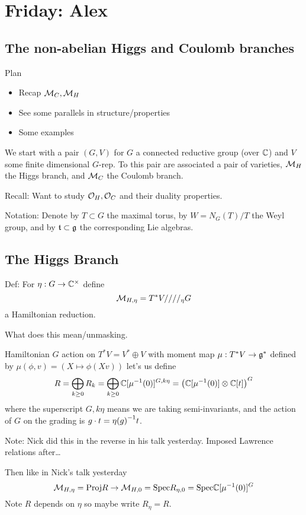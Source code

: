 \section{Friday: Alex}

\subsection{The non-abelian Higgs and Coulomb branches}

Plan 
\begin{itemize}
    \item Recap $\mathcal{M}_C,\mathcal{M}_H$
    \item See some parallels in structure/properties 
    \item Some examples
\end{itemize}

We start with a pair $(G,V)$ for $G$ a connected reductive group (over $\mathbb{C}$) and $V$ some finite dimensional $G$-rep. To this pair are associated a pair of varieties, $\mathcal{M}_H$ the Higgs branch, and $\mathcal{M}_C$ the Coulomb branch. 

Recall: Want to study ${\mathcal{O}}_H, {\mathcal{O}}_C$ and their duality properties. 

Notation: Denote by $T\subset G$ the maximal torus, by $W = N_G(T)/T$ the Weyl group, and by ${\mathfrak{t}}\subset \mathfrak{g}$ the corresponding Lie algebras.

\subsection{The Higgs Branch}

Def: For $\eta : G\rightarrow \mathbb{C}^\times$ define 
\[
    \mathcal{M}_{H,\eta} = T^\ast V ////_\eta G    
\]
a Hamiltonian reduction.

What does this mean/unmasking. 

Hamiltonian $G$ action on $T^\ast V = V^\ast \oplus V$ with moment map $\mu : T^\ast V \rightarrow \mathfrak{g}^\ast$ defined by $\mu(\phi,v) = (X\mapsto \phi(Xv))$ let's us define 
\[
    R = \bigoplus_{k\ge 0} R_k = \bigoplus_{k\ge 0} \mathbb{C}[{\mu}^{-1}(0)]^{G,k\eta} = \left(\mathbb{C}[{\mu}^{-1}(0)]\otimes \mathbb{C}[t] \right)^G
\]
where the superscript $G,k\eta$ means we are taking semi-invariants, and the action of $G$ on the grading is $g\cdot t = {\eta(g)}^{-1}t$. 

Note: Nick did this in the reverse in his talk yesterday. Imposed Lawrence relations after\ldots 

Then like in Nick's talk yesterday 
\[\mathcal{M}_{H,\eta} = {\rm Proj } R \rightarrow \mathcal{M}_{H,0} = {\rm Spec } R_{\eta,0} = {\rm Spec } \mathbb{C}[{\mu}^{-1}(0)]^G \]
Note $R$ depends on $\eta$ so maybe write $R_\eta = R$. 

